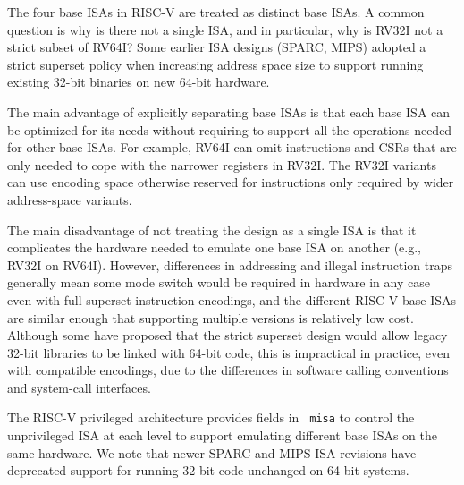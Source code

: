 \begin{commentary}
The four base ISAs in RISC-V are treated as distinct base ISAs.  A
common question is why is there not a single ISA, and in particular,
why is RV32I not a strict subset of RV64I?  Some earlier ISA designs
(SPARC, MIPS) adopted a strict superset policy when increasing address
space size to support running existing 32-bit binaries on new 64-bit
hardware.

The main advantage of explicitly separating base ISAs is that each
base ISA can be optimized for its needs without requiring to support
all the operations needed for other base ISAs.  For example, RV64I can
omit instructions and CSRs that are only needed to cope with the
narrower registers in RV32I.  The RV32I variants can use encoding
space otherwise reserved for instructions only required by wider
address-space variants.

The main disadvantage of not treating the design as a single ISA is
that it complicates the hardware needed to emulate one base ISA on
another (e.g., RV32I on RV64I).  However, differences in addressing
and illegal instruction traps generally mean some mode switch would be
required in hardware in any case even with full superset instruction
encodings, and the different RISC-V base ISAs are similar enough that
supporting multiple versions is relatively low cost.  Although some
have proposed that the strict superset design would allow legacy
32-bit libraries to be linked with 64-bit code, this is impractical in
practice, even with compatible encodings, due to the differences in
software calling conventions and system-call interfaces.

The RISC-V privileged architecture provides fields in {\tt
  misa} to control the unprivileged ISA at each level to support emulating
different base ISAs on the same hardware.  We note that newer SPARC
and MIPS ISA revisions have deprecated support for running 32-bit code
unchanged on 64-bit systems.


\end{commentary}
